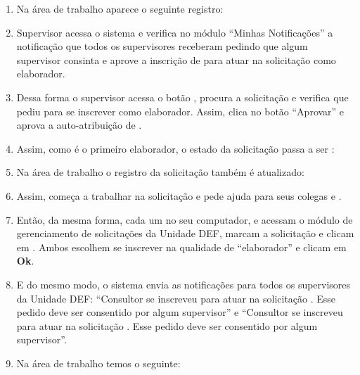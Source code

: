 \begin{landscape}
\begin{enumerate}
	\item Na área de trabalho \EU aparece o seguinte registro:
	
	
	\item Supervisor \SC acessa o sistema e verifica no módulo ``Minhas Notificações'' a notificação que todos os supervisores receberam pedindo que algum supervisor consinta e aprove a inscrição de \EU para atuar na solicitação \SOLT como elaborador.
	
	\item Dessa forma o supervisor \SC acessa o botão \bGerInscricoes, procura a solicitação \SOLT e  verifica que \EU pediu para se inscrever como elaborador. Assim, \SC clica no botão ``Aprovar'' e aprova a auto-atribuição de \EU.
	
	\item Assim, como \EU é o primeiro elaborador, o estado da solicitação passa a ser :
	
	
	\item Na área de trabalho \EU o registro da solicitação também é atualizado:

	
	\item Assim, \EU começa a trabalhar na solicitação e pede ajuda para seus colegas \ED e \EQ.
	
	\item Então, da mesma forma, cada um no seu computador, \ED e \EQ acessam o módulo de gerenciamento de solicitações da Unidade DEF, marcam a solicitação e clicam em \bInscrever. Ambos escolhem se inscrever na qualidade de ``elaborador'' e clicam em \textbf{Ok}. 
	
	\item E do mesmo modo, o sistema envia as notificações para todos os supervisores da Unidade DEF: ``Consultor \ED se inscreveu para atuar na solicitação \SOLT. Esse pedido deve ser consentido por algum supervisor'' e ``Consultor \EQ se inscreveu para atuar na solicitação \SOLT. Esse pedido deve ser consentido por algum supervisor''.
	
	\item Na área de trabalho \ED temos o seguinte:
	

\end{enumerate}
\end{landscape}
